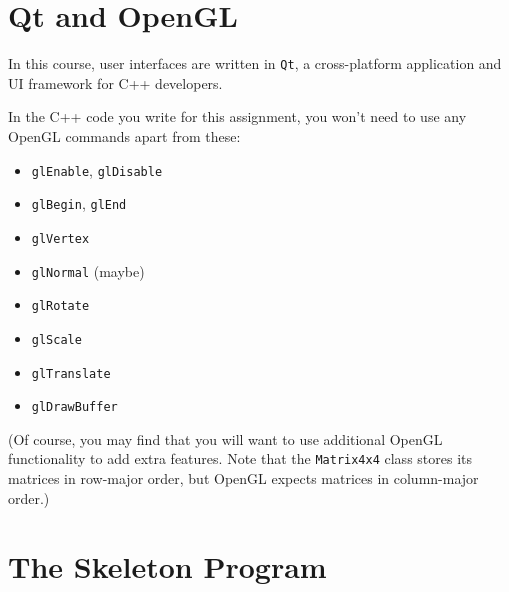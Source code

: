 \section{Qt and OpenGL}

In this course, user interfaces are written in \texttt{Qt}, a cross-platform
application and UI framework for C++ developers. 

In the C++ code you write for this assignment, you won't need to use
any OpenGL commands apart from these:

\begin{itemize}
	\item \texttt{glEnable}, \texttt{glDisable}
	\item \texttt{glBegin}, \texttt{glEnd}
	\item \texttt{glVertex}
	\item \texttt{glNormal} (maybe)
	\item \texttt{glRotate}
	\item \texttt{glScale}
	\item \texttt{glTranslate}
        \item \texttt{glDrawBuffer}
\end{itemize}

(Of course, you may find that you will want to use additional OpenGL
functionality to add extra features.
Note that the \texttt{Matrix4x4} class stores its matrices in row-major
order, but OpenGL expects matrices in column-major order.)

\iffalse
\subsection{Double buffering}

Your program should support both single and double buffering.  In single
buffering, graphics commands draw directly onto the screen.  In
double buffering, drawing happens on a ``back buffer'' that is then
swapped with the ``front buffer'' when drawing is complete. Because
the swapping happens quickly, the user never sees a half-complete rendering.

The OpenGL command \texttt{glDrawBuffer} lets you choose which buffer
to draw into.  The \texttt{gtk\-gl\-ext\-mm} widget allows you to swap the
buffers, and this is already implemented for you in \texttt{viewer.cpp}
\fi

\section{The Skeleton Program}

